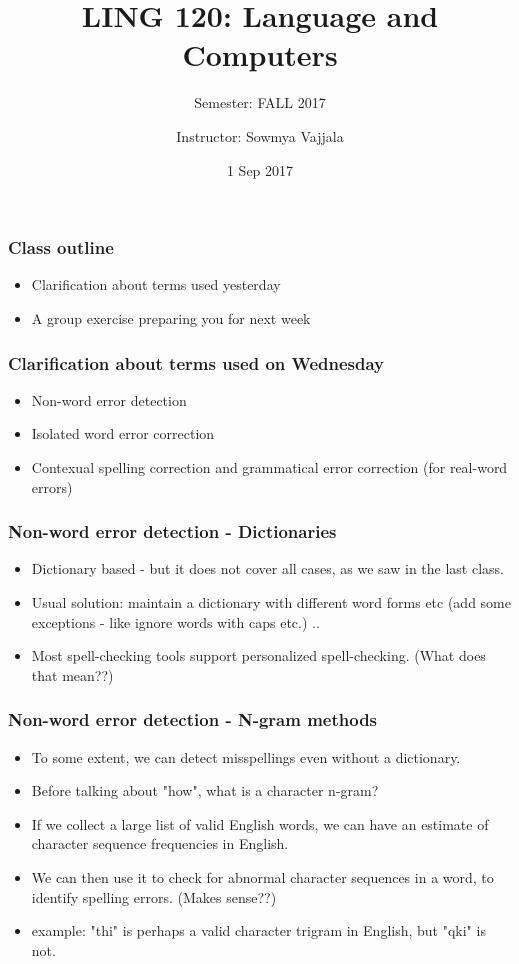 \documentclass{beamer}
\author[Sowmya Vajjala]{Instructor: Sowmya Vajjala}
\title[LING 120]{LING 120: Language and Computers}
\subtitle{Semester: FALL 2017}
\date{1 Sep 2017}
\institute{Iowa State University, USA}
\begin{document}
\begin{frame}\titlepage
\end{frame}

\begin{frame}
\frametitle{Class outline}
\begin{itemize}
\item Clarification about terms used yesterday
\item A group exercise preparing you for next week
\end{itemize} 
\end{frame}

\begin{frame}
\frametitle{Clarification about terms used on Wednesday}
\begin{itemize}
\item Non-word error detection
\item Isolated word error correction
\item Contexual spelling correction and grammatical error correction (for real-word errors)
\end{itemize} 
\end{frame}

\begin{frame}
\frametitle{Non-word error detection - Dictionaries}
\begin{itemize}
\item Dictionary based - but it does not cover all cases, as we saw in the last class.
\item Usual solution: maintain a dictionary with different word forms etc (add some exceptions - like ignore words with caps etc.) .. 

\item Most spell-checking tools support personalized spell-checking. (What does that mean??)
\end{itemize}
\end{frame}

\begin{frame}
\frametitle{Non-word error detection - N-gram methods}
\begin{itemize}
\item To some extent, we can detect misspellings even without a dictionary. 
\item Before talking about "how", what is a character n-gram? \pause
\item If we collect a large list of valid English words, we can have an estimate of character sequence frequencies in English. 
\item We can then use it to check for abnormal character sequences in a word, to identify spelling errors. (Makes sense??) \pause
\item example: "thi" is perhaps a valid character trigram in English, but "qki" is not. 
\end{itemize}
\end{frame}
\end{document}
